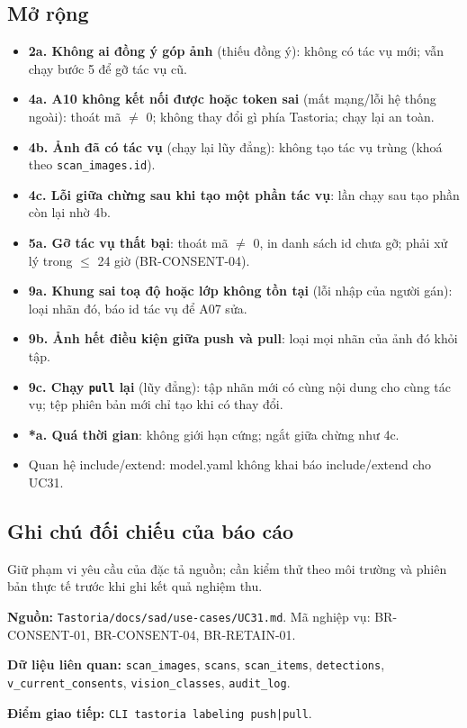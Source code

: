 \subsection{Mở rộng}
\begin{itemize}
\item \textbf{2a. Không ai đồng ý góp ảnh} (thiếu đồng ý): không có tác vụ mới; vẫn chạy bước 5 để gỡ tác vụ cũ.
\item \textbf{4a. A10 không kết nối được hoặc token sai} (mất mạng/\allowbreak{}lỗi hệ thống ngoài): thoát mã \ensuremath{\neq} 0; không thay đổi gì phía Tastoria; chạy lại an toàn.
\item \textbf{4b. Ảnh đã có tác vụ} (chạy lại lũy đẳng): không tạo tác vụ trùng (khoá theo {\small\texttt{scan\_\allowbreak{}\allowbreak{}images.\allowbreak{}id}}).
\item \textbf{4c. Lỗi giữa chừng sau khi tạo một phần tác vụ}: lần chạy sau tạo phần còn lại nhờ 4b.
\item \textbf{5a. Gỡ tác vụ thất bại}: thoát mã \ensuremath{\neq} 0, in danh sách id chưa gỡ; phải xử lý trong \ensuremath{\leq} 24 giờ (BR-\allowbreak{}CONSENT-\allowbreak{}04).
\item \textbf{9a. Khung sai toạ độ hoặc lớp không tồn tại} (lỗi nhập của người gán): loại nhãn đó, báo id tác vụ để A07 sửa.
\item \textbf{9b. Ảnh hết điều kiện giữa push và pull}: loại mọi nhãn của ảnh đó khỏi tập.
\item \textbf{9c. Chạy {\small\texttt{pull}} lại} (lũy đẳng): tập nhãn mới có cùng nội dung cho cùng tác vụ; tệp phiên bản mới chỉ tạo khi có thay đổi.
\item \textbf{*a. Quá thời gian}: không giới hạn cứng; ngắt giữa chừng như 4c.
\item Quan hệ include/\allowbreak{}extend: model.yaml không khai báo include/\allowbreak{}extend cho UC31.
\end{itemize}
\subsection{Ghi chú đối chiếu của báo cáo}
Giữ phạm vi yêu cầu của đặc tả nguồn; cần kiểm thử theo môi trường và phiên bản thực tế trước khi ghi kết quả nghiệm thu.

\textbf{Nguồn:} {\small\texttt{Tastoria/\allowbreak{}\allowbreak{}docs/\allowbreak{}\allowbreak{}sad/\allowbreak{}\allowbreak{}use-\allowbreak{}cases/\allowbreak{}\allowbreak{}UC31.\allowbreak{}md}}. Mã nghiệp vụ: BR-\allowbreak{}CONSENT-\allowbreak{}01, BR-\allowbreak{}CONSENT-\allowbreak{}04, BR-\allowbreak{}RETAIN-\allowbreak{}01.

\textbf{Dữ liệu liên quan:} {\small\texttt{scan\_\allowbreak{}\allowbreak{}images}}, {\small\texttt{scans}}, {\small\texttt{scan\_\allowbreak{}\allowbreak{}items}}, {\small\texttt{detections}}, {\small\texttt{v\_\allowbreak{}\allowbreak{}current\_\allowbreak{}\allowbreak{}consents}}, {\small\texttt{vision\_\allowbreak{}\allowbreak{}classes}}, {\small\texttt{audit\_\allowbreak{}\allowbreak{}log}}.

\textbf{Điểm giao tiếp:} {\small\texttt{CLI tastoria labeling push|\allowbreak{}pull}}.
